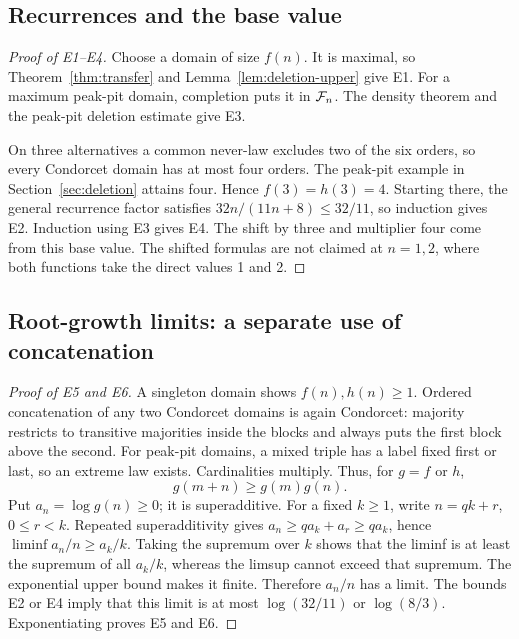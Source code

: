 \subsection{Recurrences and the base value}
\begin{proof}[Proof of E1--E4]
Choose a domain of size \(f(n)\). It is maximal, so
Theorem~\ref{thm:transfer} and Lemma~\ref{lem:deletion-upper} give E1.
For a maximum peak-pit domain, completion puts it in \(\mathcal F_n\).
The density theorem and the peak-pit deletion estimate give E3.

On three alternatives a common never-law excludes two of the six
orders, so every Condorcet domain has at most four orders. The
peak-pit example in Section~\ref{sec:deletion} attains four. Hence
\(f(3)=h(3)=4\). Starting there, the general recurrence factor satisfies
\(32n/(11n+8)\leq32/11\), so induction gives E2. Induction using
E3 gives E4. The shift by three and multiplier four come from this
base value. The shifted formulas are not claimed at \(n=1,2\), where
both functions take the direct values 1 and 2.
\end{proof}

\subsection{Root-growth limits: a separate use of concatenation}
\begin{proof}[Proof of E5 and E6]
A singleton domain shows \(f(n),h(n)\geq1\). Ordered concatenation of
any two Condorcet domains is again Condorcet: majority restricts to
transitive majorities inside the blocks and always puts the first
block above the second. For peak-pit domains, a mixed triple has a
label fixed first or last, so an extreme law exists. Cardinalities
multiply. Thus, for \(g=f\) or \(h\),
\[
 g(m+n)\geq g(m)g(n).
\]
Put \(a_n=\log g(n)\geq0\); it is superadditive. For a fixed
\(k\geq1\), write \(n=qk+r\), \(0\leq r<k\). Repeated
superadditivity gives \(a_n\geq q a_k+a_r\geq q a_k\), hence
\(\liminf a_n/n\geq a_k/k\). Taking the supremum over \(k\)
shows that the liminf is at least the supremum of all \(a_k/k\),
whereas the limsup cannot exceed that supremum. The exponential
upper bound makes it finite. Therefore \(a_n/n\) has a limit.
The bounds E2 or E4 imply that this limit is at most \(\log(32/11)\)
or \(\log(8/3)\). Exponentiating proves E5 and E6.
\end{proof}

